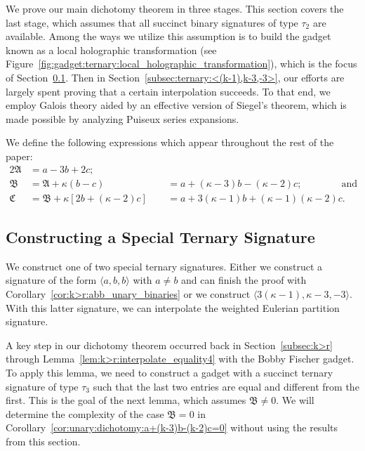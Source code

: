 \documentclass[11pt]{article}
\begin{document}
We prove our main dichotomy theorem in three stages.
This section covers the last stage,
which assumes that all succinct binary signatures of type $\tau_2$ are available.
Among the ways we utilize this assumption is
to build the gadget known as a local holographic transformation (see Figure~\ref{fig:gadget:ternary:local_holographic_transformation}),
which is the focus of Section~\ref{subsec:ternary:construct}.
Then in Section~\ref{subsec:ternary:<(k-1),k-3,-3>},
our efforts are largely spent proving that a certain interpolation succeeds.
To that end,
we employ Galois theory aided by an effective version of Siegel's theorem,
which is made possible by analyzing Puiseux series expansions.

We define the following expressions which appear throughout the rest of the paper:
\begin{alignat}{2}
 \mathfrak{A} &= a - 3b + 2 c; \label{eqn:ternary:frakA}\\
 \mathfrak{B} &= \mathfrak{A} + \kappa (b - c)                &&~~ = a +   (\kappa - 3) b -              (\kappa - 2) c; \qquad \qquad \text{and} \label{eqn:ternary:frakB}\\
 \mathfrak{C} &= \mathfrak{B} + \kappa [2 b + (\kappa - 2) c] &&~~ = a + 3 (\kappa - 1) b + (\kappa - 1) (\kappa - 2) c. \label{eqn:ternary:frakC}
\end{alignat}

\subsection{Constructing a Special Ternary Signature} \label{subsec:ternary:construct}

We construct one of two special ternary signatures.
Either we construct a signature of the form $\langle a,b,b \rangle$ with $a \ne b$ and can finish the proof with Corollary~\ref{cor:k>r:abb_unary_binaries}
or we construct $\langle 3 (\kappa - 1), \kappa - 3, -3 \rangle$.
With this latter signature,
we can interpolate the weighted Eulerian partition signature.

A key step in our dichotomy theorem occurred back in Section~\ref{subsec:k>r} through Lemma~\ref{lem:k>r:interpolate_equality4} with the Bobby Fischer gadget.
To apply this lemma,
we need to construct a gadget with a succinct ternary signature of type $\tau_3$ such that the last two entries are equal and different from the first.
This is the goal of the next lemma,
which assumes $\mathfrak{B} \ne 0$.
We will determine the complexity of the case $\mathfrak{B} = 0$ in Corollary~\ref{cor:unary:dichotomy:a+(k-3)b-(k-2)c=0} without using the results from this section.
\end{document}
